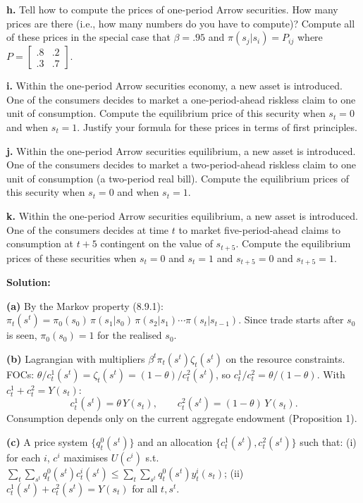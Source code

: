 \documentclass[12pt, letterpaper]{article}
\begin{document}
\begin{tcolorbox}[oddbox,title={Exercise 8.7 \quad Two consumers, Markov endowment}]
\begin{tcolorbox}[questionbox]
\textbf{h.} Tell how to compute the prices of one-period Arrow securities. How many prices are there (i.e.,
how many numbers do you have to compute)? Compute all of these prices in the special case that
$\beta=.95$ and $\pi(s_j|s_i)=P_{ij}$ where $P=\begin{bmatrix}.8&.2\\.3&.7\end{bmatrix}$.

\textbf{i.} Within the one-period Arrow securities economy, a new asset is introduced. One of the consumers
decides to market a one-period-ahead riskless claim to one unit of consumption. Compute the equilibrium
price of this security when $s_t=0$ and when $s_t=1$. Justify your formula for these prices in terms of
first principles.

\textbf{j.} Within the one-period Arrow securities equilibrium, a new asset is introduced. One of the
consumers decides to market a two-period-ahead riskless claim to one unit of consumption (a two-period
real bill). Compute the equilibrium prices of this security when $s_t=0$ and when $s_t=1$.

\textbf{k.} Within the one-period Arrow securities equilibrium, a new asset is introduced. One of the
consumers decides at time $t$ to market five-period-ahead claims to consumption at $t+5$ contingent on the
value of $s_{t+5}$. Compute the equilibrium prices of these securities when $s_t=0$ and $s_t=1$ and
$s_{t+5}=0$ and $s_{t+5}=1$.
\end{tcolorbox}

\textbf{Solution:}

\textbf{(a)} By the Markov property (8.9.1): $\pi_t(s^t)=\pi_0(s_0)\,\pi(s_1|s_0)\,\pi(s_2|s_1)\cdots\pi(s_t|s_{t-1})$.
Since trade starts after $s_0$ is seen, $\pi_0(s_0)=1$ for the realised $s_0$.

\textbf{(b)} Lagrangian with multipliers $\beta^t\pi_t(s^t)\zeta_t(s^t)$ on the resource constraints. FOCs:
$\theta/c^1_t(s^t)=\zeta_t(s^t)=(1-\theta)/c^2_t(s^t)$, so $c^1_t/c^2_t=\theta/(1-\theta)$. With
$c^1_t+c^2_t=Y(s_t)$:
\[
\boxed{c^1_t(s^t)=\theta\,Y(s_t),\qquad c^2_t(s^t)=(1-\theta)\,Y(s_t).}
\]
Consumption depends only on the current aggregate endowment (Proposition 1).

\textbf{(c)} A price system $\{q^0_t(s^t)\}$ and an allocation $\{c^1_t(s^t),c^2_t(s^t)\}$ such that: (i) for each $i$,
$c^i$ maximises $U(c^i)$ s.t.\ $\sum_t\sum_{s^t}q^0_t(s^t)c^i_t(s^t)\le\sum_t\sum_{s^t}q^0_t(s^t)y^i_t(s_t)$;
(ii) $c^1_t(s^t)+c^2_t(s^t)=Y(s_t)$ for all $t,s^t$.


\end{tcolorbox}
\end{document}
